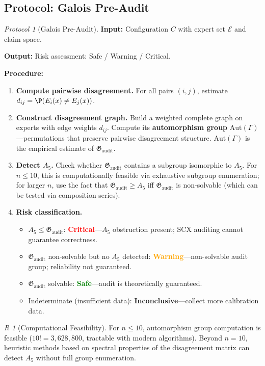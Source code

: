 \documentclass[12pt,a4paper]{article}
\theoremstyle{remark}
\newtheorem{remark}[theorem]Remark
\newtheorem{protocol}[theorem]{Protocol}
\newcommand{\Aut}{\mathrm{Aut}}
\newcommand{\AuditGrp}{\mathfrak{G}_{\mathrm{audit}}}
\newcommand{\ExpertSet}{\mathcal{E}}
\begin{document}
\subsection{Protocol: Galois Pre-Audit}
\begin{protocol}[Galois Pre-Audit]\label{prot:preaudit}
\textbf{Input:} Configuration \(C\) with expert set \(\ExpertSet\) and claim space.

\textbf{Output:} Risk assessment: Safe / Warning / Critical.

\textbf{Procedure:}
\begin{enumerate}[label=\textbf{D\arabic*},itemsep=4pt,leftmargin=*]
    \item \textbf{Compute pairwise disagreement.}
    For all pairs \((i,j)\), estimate \(d_{ij} = \P(E_i(x) \neq E_j(x))\).
    \item \textbf{Construct disagreement graph.}
    Build a weighted complete graph on experts with edge weights \(d_{ij}\). Compute its \textbf{automorphism group} \(\Aut(\Gamma)\)---permutations that preserve pairwise disagreement structure. \(\Aut(\Gamma)\) is the empirical estimate of \(\AuditGrp\).
    \item \textbf{Detect \(A_5\).}
    Check whether \(\AuditGrp\) contains a subgroup isomorphic to \(A_5\). For \(n \leq 10\), this is computationally feasible via exhaustive subgroup enumeration; for larger \(n\), use the fact that \(\AuditGrp \geq A_5\) iff \(\AuditGrp\) is non-solvable (which can be tested via composition series).
    \item \textbf{Risk classification.}
    \begin{itemize}
        \item \(A_5 \leq \AuditGrp\): \textcolor{red}{\textbf{Critical}}---\(A_5\) obstruction present; SCX auditing cannot guarantee correctness.
        \item \(\AuditGrp\) non-solvable but no \(A_5\) detected: \textcolor{orange}{\textbf{Warning}}---non-solvable audit group; reliability not guaranteed.
        \item \(\AuditGrp\) solvable: \textcolor{green}{\textbf{Safe}}---audit is theoretically guaranteed.
        \item Indeterminate (insufficient data): \textbf{Inconclusive}---collect more calibration data.
    \end{itemize}
\end{enumerate}
\end{protocol}

\begin{remark}[Computational Feasibility]
For \(n \leq 10\), automorphism group computation is feasible (\(10! = 3,628,800\), tractable with modern algorithms). Beyond \(n=10\), heuristic methods based on spectral properties of the disagreement matrix can detect \(A_5\) without full group enumeration.
\end{remark}
\end{document}

